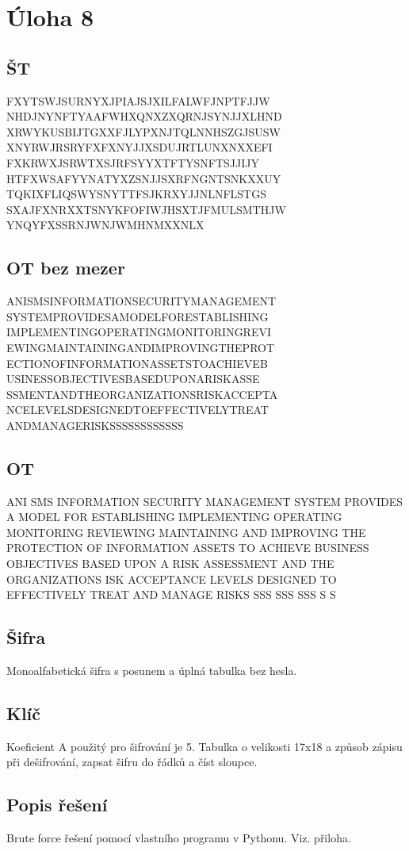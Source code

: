 \documentclass[12pt]{article} %
\begin{document}
\section{Úloha 8}
\subsection{ŠT}
FXYTSWJSURNYXJPIAJSJXILFALWFJNPTFJJW
NHDJNYNFTYAAFWHXQNXZXQRNJSYNJJXLHND
XRWYKUSBIJTGXXFJLYPXNJTQLNNHSZGJSUSW
XNYRWJRSRYFXFXNYJJXSDUJRTLUNXNXXEFI
FXKRWXJSRWTXSJRFSYYXTFTYSNFTSJJIJY
HTFXWSAFYYNATYXZSNJJSXRFNGNTSNKXXUY
TQKIXFLIQSWYSNYTTFSJKRXYJJNLNFLSTGS
SXAJFXNRXXTSNYKFOFIWJHSXTJFMULSMTHJW
YNQYFXSSRNJWNJWMHNMXXNLX

\subsection{OT bez mezer}
ANISMSINFORMATIONSECURITYMANAGEMENT
SYSTEMPROVIDESAMODELFORESTABLISHING
IMPLEMENTINGOPERATINGMONITORINGREVI
EWINGMAINTAININGANDIMPROVINGTHEPROT
ECTIONOFINFORMATIONASSETSTOACHIEVEB
USINESSOBJECTIVESBASEDUPONARISKASSE
SSMENTANDTHEORGANIZATIONSRISKACCEPTA
NCELEVELSDESIGNEDTOEFFECTIVELYTREAT
ANDMANAGERISKSSSSSSSSSSSS
\subsection{OT}
ANI SMS INFORMATION SECURITY MANAGEMENT
SYSTEM PROVIDES A MODEL FOR ESTABLISHING 
IMPLEMENTING OPERATING MONITORING REVIEWING
MAINTAINING AND IMPROVING THE PROTECTION OF
INFORMATION ASSETS TO ACHIEVE BUSINESS OBJECTIVES
BASED UPON A RISK ASSESSMENT AND THE ORGANIZATIONS 
ISK ACCEPTANCE LEVELS DESIGNED TO EFFECTIVELY TREAT
AND MANAGE RISKS SSS SSS SSS S S
\subsection{Šifra}
Monoalfabetická šifra s posunem a úplná tabulka bez hesla.

\subsection{Klíč}
Koeficient A použitý pro šifrování je 5. Tabulka o velikosti 17x18 a způsob zápisu při dešifrování, zapsat šifru do řádků a číst sloupce.
\subsection{Popis řešení}
Brute force řešení pomocí vlastního programu v Pythonu. Viz. přiloha.
\end{document}
